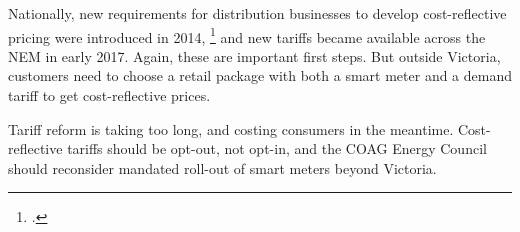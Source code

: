 \documentclass[FrontPage]{grattan}
\begin{document}
Nationally, new requirements for distribution businesses to develop cost-reflective pricing were introduced in 2014,%
\footcite{AEMC2014NetworkTariffReform} and new tariffs became available across the NEM in early 2017. Again, these are important first steps. But outside Victoria, customers need to choose a retail package with both a smart meter and a demand tariff to get cost-reflective prices.

Tariff reform is taking too long, and costing consumers in the meantime. Cost-reflective tariffs should be opt-out, not opt-in, and the COAG Energy Council should reconsider mandated roll-out of smart meters beyond Victoria. 



\end{document}
